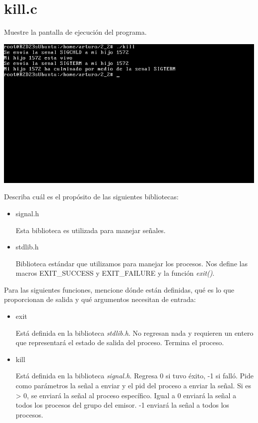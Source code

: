 \section{kill.c}

	Muestre la pantalla de ejecución del programa.

	\begin{center}
		\includegraphics[width=\linewidth]{imagenes/kill.png}
	\end{center}

	Describa cuál es el propósito de las siguientes bibliotecas:

	\begin{itemize}

		\item signal.h
	\begin{tcolorbox}
		Esta biblioteca es utilizada para manejar señales.
	\end{tcolorbox}
		\item stdlib.h
	\begin{tcolorbox}
		Biblioteca estándar que utilizamos para manejar los procesos. Nos define las macros EXIT\_SUCCESS y EXIT\_FAILURE y la función \textit{exit()}.
	\end{tcolorbox}

	\end{itemize}

	Para las siguientes funciones, mencione dónde están definidas, qué es lo que proporcionan de salida y qué argumentos necesitan de entrada:

	\begin{itemize}

		\item exit
	\begin{tcolorbox}
		Está definida en la biblioteca \textit{stdlib.h}. No regresan nada y requieren un entero que representará el estado de salida del proceso. Termina el proceso.
	\end{tcolorbox}
		\item kill
	\begin{tcolorbox}
		Está definida en la biblioteca \textit{signal.h}. Regresa 0 si tuvo éxito, -1 si falló. Pide como parámetros la señal a enviar y el pid del proceso a enviar la señal. Si es > 0, se enviará la señal al proceso específico. Igual a 0 enviará la señal a todos los procesos del grupo del emisor. -1 enviará la señal a todos los procesos.
	\end{tcolorbox}

	\end{itemize}

